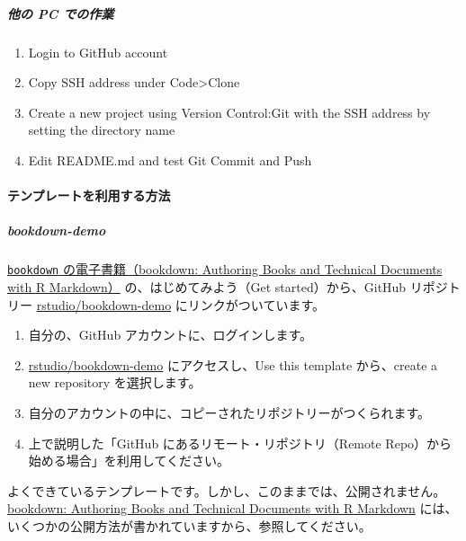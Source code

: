 \documentclass[
]{bxjsbook}
\providecommand{\tightlist}{%
  \setlength{\itemsep}{0pt}\setlength{\parskip}{0pt}}
\theoremstyle{definition}
\theoremstyle{definition}
\theoremstyle{definition}
\theoremstyle{definition}
\theoremstyle{remark}
\begin{document}
\hypertarget{ux4ed6ux306e-pc-ux3067ux306eux4f5cux696d}{%
\subparagraph{他の PC での作業}\label{ux4ed6ux306e-pc-ux3067ux306eux4f5cux696d}}

\begin{enumerate}
\def\labelenumi{\arabic{enumi}.}
\tightlist
\item
  Login to GitHub account
\item
  Copy SSH address under Code\textgreater Clone
\item
  Create a new project using Version Control:Git with the SSH address by setting the directory name
\item
  Edit README.md and test Git Commit and Push
\end{enumerate}

\hypertarget{ux30c6ux30f3ux30d7ux30ecux30fcux30c8ux3092ux5229ux7528ux3059ux308bux65b9ux6cd5}{%
\paragraph{テンプレートを利用する方法}\label{ux30c6ux30f3ux30d7ux30ecux30fcux30c8ux3092ux5229ux7528ux3059ux308bux65b9ux6cd5}}

\hypertarget{bookdown-demo}{%
\subparagraph{bookdown-demo}\label{bookdown-demo}}

\href{https://bookdown.org/yihui/bookdown/}{\texttt{bookdown} の電子書籍（bookdown: Authoring Books and Technical Documents with R Markdown）} の、はじめてみよう（Get started）から、GitHub リポジトリー \href{https://github.com/rstudio/bookdown-demo}{rstudio/bookdown-demo} にリンクがついています。

\begin{enumerate}
\def\labelenumi{\arabic{enumi}.}
\tightlist
\item
  自分の、GitHub アカウントに、ログインします。
\item
  \href{https://github.com/rstudio/bookdown-demo}{rstudio/bookdown-demo} にアクセスし、Use this template から、create a new repository を選択します。
\item
  自分のアカウントの中に、コピーされたリポジトリーがつくられます。
\item
  上で説明した「GitHub にあるリモート・リポジトリ（Remote Repo）から始める場合」を利用してください。
\end{enumerate}

よくできているテンプレートです。しかし、このままでは、公開されません。\href{https://bookdown.org/yihui/bookdown/}{bookdown: Authoring Books and Technical Documents with R Markdown} には、いくつかの公開方法が書かれていますから、参照してください。
\end{document}
